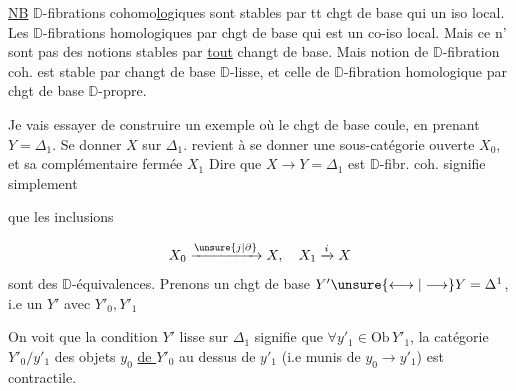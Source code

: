 \uline{NB}  $\mathbb D$-fibrations cohomo\uline{lo}giques sont stables par tt chgt de base qui  un iso local. Les $\mathbb D$-fibrations homologiques par  chgt de base qui est un co-iso local. Mais ce n' sont pas des notions stables par \uline{tout} changt de base. Mais  notion de $\mathbb D$-fibration coh. est stable par changt de base $\mathbb D$-lisse, et celle de $\mathbb D$-fibration homologique par chgt de base $\mathbb D$-propre.


Je vais essayer de construire un exemple où le chgt de base coule, en prenant $Y=\Delta_1$. Se donner $X$ sur $\Delta_1$. revient à se donner une sous-catégorie ouverte $X_0$, et sa complémentaire fermée $X_1$
Dire que $X\longrightarrow Y=\Delta_1$ est  $\mathbb D$-fibr. coh. signifie simplement

que les inclusions

\[
X_0\xrightarrow{\unsure{j|\partial}}X,\quad X_1\xrightarrow{i}X
\]
sont des $\mathbb D$-équivalences. Prenons un chgt de base $Y'\unsure{\longleftrightarrow|\longrightarrow}Y=\Delta^1$, i.e un $Y'$ avec $Y'_0,Y'_1$

On voit que la condition $Y'$ lisse sur $\Delta_1$ signifie que $\forall y'_1\in\mathrm{Ob}\,Y'_1$, la catégorie $Y'_0/y'_1$ des objets $y_0$ \uline{de $Y'_0$} au dessus de $y'_1$ (i.e munis de $y_0\longrightarrow y'_1$) est contractile.

\margin{$\longrightarrow$}

